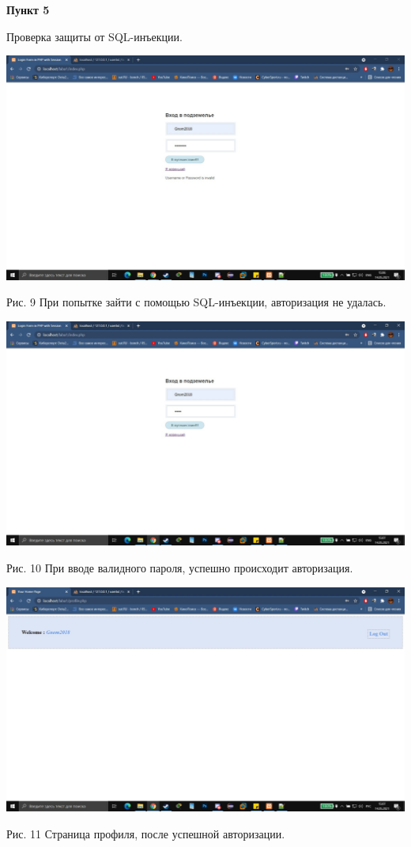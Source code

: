 \documentclass[a4paper,14pt]{extarticle}
\begin{document}
    \newpage
    \textbf{Пункт 5}
    \vspace{-3ex}
    \begin{center}
        \singlespacing
        Проверка защиты от SQL-инъекции.

        \includegraphics[scale=0.25]{pics/9.jpg}

        Рис. 9 При попытке зайти с помощью SQL-инъекции, авторизация не удалась. 
        \vspace{1ex}

        \includegraphics[scale=0.25]{pics/10.jpg}

        Рис. 10 При вводе валидного пароля, успешно происходит авторизация.

        \includegraphics[scale=0.25]{pics/11.jpg}

        Рис. 11 Страница профиля, после успешной авторизации.
    \end{center}
\end{document}
